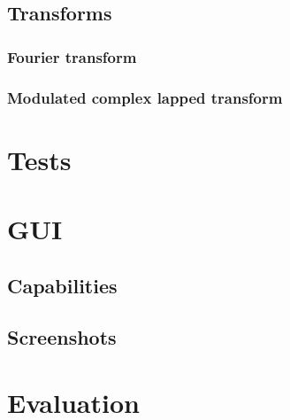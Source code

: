 \subsection{Transforms}
\subsubsection{Fourier transform}
\subsubsection{Modulated complex lapped transform}
\section{Tests}
\section{GUI}
\subsection{Capabilities}

\subsection{Screenshots}
\section{Evaluation}